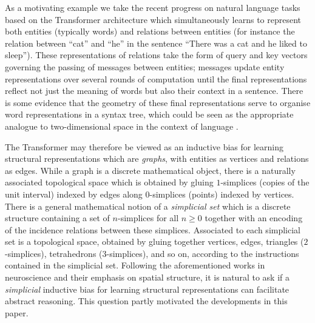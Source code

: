 \documentclass{article} %
\begin{document}
As a motivating example we take the recent progress on natural language tasks based on the Transformer architecture \citep{attention} which simultaneously learns to represent both entities (typically words) and relations between entities (for instance the relation between ``cat'' and ``he'' in the sentence ``There was a cat and he liked to sleep''). These representations of relations take the form of query and key vectors governing the passing of messages between entities; messages update entity representations over several rounds of computation until the final representations reflect not just the meaning of words but also their context in a sentence. There is some evidence that the geometry of these final representations serve to organise word representations in a syntax tree, which could be seen as the appropriate analogue to two-dimensional space in the context of language \citep{hewitt}.

The Transformer may therefore be viewed as an inductive bias for learning structural representations which are \emph{graphs}, with entities as vertices and relations as edges. While a graph is a discrete mathematical object, there is a naturally associated topological space which is obtained by gluing $1$-simplices (copies of the unit interval) indexed by edges along $0$-simplices (points) indexed by vertices. There is a general mathematical notion of a \emph{simplicial set} which is a discrete structure containing a set of $n$-simplices for all $n \ge 0$ together with an encoding of the incidence relations between these simplices. Associated to each simplicial set is a topological space, obtained by gluing together vertices, edges, triangles ($2$-simplices), tetrahedrons ($3$-simplices), and so on, according to the instructions contained in the simplicial set. Following the aforementioned works in neuroscience \citep{constantinescu,epstein,behrens,bellmund,whittington,liu} and their emphasis on spatial structure, it is natural to ask if a \emph{simplicial} inductive bias for learning structural representations can facilitate abstract reasoning. This question partly motivated the developments in this paper. %

\end{document}
